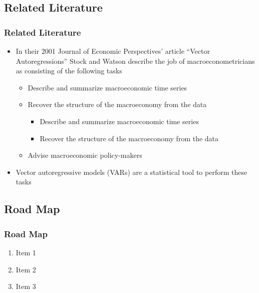 \documentclass[11pt]{beamer}
\begin{document}
\begin{frame}
	\section[Literature]{Related Literature}
	\frametitle{\bfseries Related Literature}
	
	\begin{itemize}
		\item In their 2001 Journal of Economic Perspectives' article ``Vector Autoregressions'' Stock and
		Watson describe the job of macroeconometricians as consisting of the following tasks
		
		\begin{itemize}
			\item Describe and summarize macroeconomic time series
			\item Recover the structure of the macroeconomy from the data
					
			\begin{itemize}
				\item Describe and summarize macroeconomic time series
				\item Recover the structure of the macroeconomy from the data
			\end{itemize}
			\item Advise macroeconomic policy-makers
		\end{itemize}
		\item Vector autoregressive models (VARs) are a statistical tool to perform these tasks

	\end{itemize}

\end{frame}

\begin{frame}
	\section{Road Map}
	\frametitle{\bfseries Road Map}
	
	\begin{enumerate}
		\item Item 1
		\item Item 2
		\item Item 3
	\end{enumerate}
\end{frame}
\end{document}
